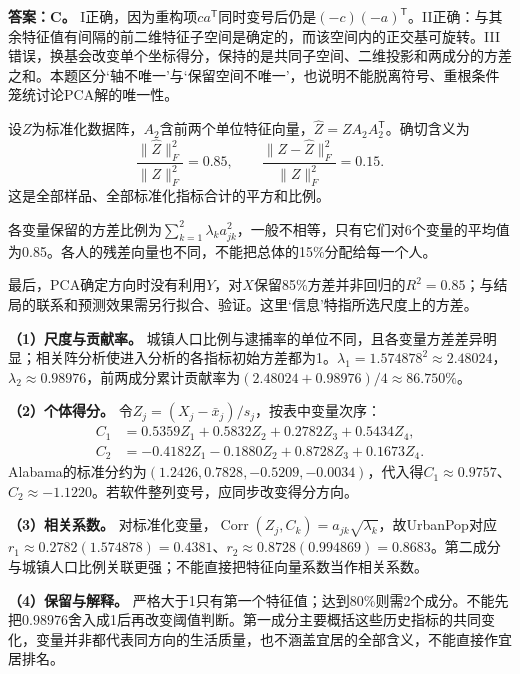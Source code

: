 \textbf{答案：C。} I正确，因为重构项$ca^{\mathsf T}$同时变号后仍是$(-c)(-a)^{\mathsf T}$。II正确：与其余特征值有间隔的前二维特征子空间是确定的，而该空间内的正交基可旋转。III错误，换基会改变单个坐标得分，保持的是共同子空间、二维投影和两成分的方差之和。本题区分‘轴不唯一’与‘保留空间不唯一’，也说明不能脱离符号、重根条件笼统讨论PCA解的唯一性。
\par\nobreak\smallskip{}

设$Z$为标准化数据阵，$A_2$含前两个单位特征向量，$\widehat Z=ZA_2A_2^{\mathsf T}$。确切含义为\[\frac{\|\widehat Z\|_F^2}{\|Z\|_F^2}=0.85,\qquad\frac{\|Z-\widehat Z\|_F^2}{\|Z\|_F^2}=0.15.\]这是全部样品、全部标准化指标合计的平方和比例。\par 各变量保留的方差比例为$\sum_{k=1}^2\lambda_k a_{jk}^2$，一般不相等，只有它们对6个变量的平均值为0.85。各人的残差向量也不同，不能把总体的15\%分配给每一个人。\par 最后，PCA确定方向时没有利用$Y$，对$X$保留85\%方差并非回归的$R^2=0.85$；与结局的联系和预测效果需另行拟合、验证。这里‘信息’特指所选尺度上的方差。
\par\nobreak\smallskip{}

\textbf{（1）尺度与贡献率。} 城镇人口比例与逮捕率的单位不同，且各变量方差差异明显；相关阵分析使进入分析的各指标初始方差都为1。$\lambda_1=1.574878^2\approx2.48024$，$\lambda_2\approx0.98976$，前两成分累计贡献率为$(2.48024+0.98976)/4\approx86.750\%$。\par\textbf{（2）个体得分。} 令$Z_j=(X_j-\bar x_j)/s_j$，按表中变量次序：\[\begin{aligned}C_1&=0.5359Z_1+0.5832Z_2+0.2782Z_3+0.5434Z_4,\\C_2&=-0.4182Z_1-0.1880Z_2+0.8728Z_3+0.1673Z_4.\end{aligned}\]Alabama的标准分约为$(1.2426,0.7828,-0.5209,-0.0034)$，代入得$C_1\approx0.9757$、$C_2\approx-1.1220$。若软件整列变号，应同步改变得分方向。\par\textbf{（3）相关系数。} 对标准化变量，$\operatorname{Corr}(Z_j,C_k)=a_{jk}\sqrt{\lambda_k}$，故UrbanPop对应$r_1\approx0.2782(1.574878)=0.4381$、$r_2\approx0.8728(0.994869)=0.8683$。第二成分与城镇人口比例关联更强；不能直接把特征向量系数当作相关系数。\par\textbf{（4）保留与解释。} 严格大于1只有第一个特征值；达到80\%则需2个成分。不能先把$0.98976$舍入成1后再改变阈值判断。第一成分主要概括这些历史指标的共同变化，变量并非都代表同方向的生活质量，也不涵盖宜居的全部含义，不能直接作宜居排名。
\par\nobreak\smallskip{}

